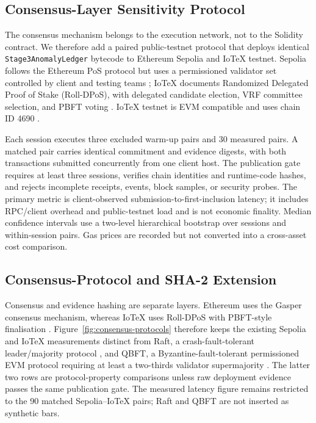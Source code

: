 \subsection{Consensus-Layer Sensitivity Protocol}
The consensus mechanism belongs to the execution network, not to the Solidity contract. We therefore add a paired public-testnet protocol that deploys identical \texttt{Stage3AnomalyLedger} bytecode to Ethereum Sepolia and IoTeX testnet. Sepolia follows the Ethereum PoS protocol but uses a permissioned validator set controlled by client and testing teams \cite{ethereumNetworks}; IoTeX documents Randomized Delegated Proof of Stake (Roll-DPoS), with delegated candidate election, VRF committee selection, and PBFT voting \cite{iotexRollDpos}. IoTeX testnet is EVM compatible and uses chain ID 4690 \cite{iotexTestnet}.

Each session executes three excluded warm-up pairs and 30 measured pairs. A matched pair carries identical commitment and evidence digests, with both transactions submitted concurrently from one client host. The publication gate requires at least three sessions, verifies chain identities and runtime-code hashes, and rejects incomplete receipts, events, block samples, or security probes. The primary metric is client-observed submission-to-first-inclusion latency; it includes RPC/client overhead and public-testnet load and is not economic finality. Median confidence intervals use a two-level hierarchical bootstrap over sessions and within-session pairs. Gas prices are recorded but not converted into a cross-asset cost comparison.

\subsection{Consensus-Protocol and SHA-2 Extension}
Consensus and evidence hashing are separate layers. Ethereum uses the Gasper
consensus mechanism, whereas IoTeX uses Roll-DPoS with PBFT-style finalisation
\cite{ethereumGasper,iotexRollDpos}. Figure~\ref{fig:consensus-protocols}
therefore keeps the existing Sepolia and IoTeX measurements distinct from
Raft, a crash-fault-tolerant leader/majority protocol
\cite{raftPaper,fabricRaft}, and QBFT, a Byzantine-fault-tolerant permissioned
EVM protocol requiring at least a two-thirds validator supermajority
\cite{besuQbft}. The latter two rows are protocol-property comparisons unless
raw deployment evidence passes the same publication gate.
The measured latency figure remains restricted to the 90 matched
Sepolia--IoTeX pairs; Raft and QBFT are not inserted as synthetic bars.

